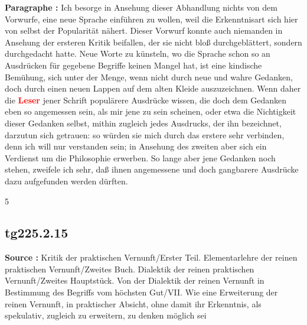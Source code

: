 \documentclass[a4paper,12pt,twoside]{book}
\newcommand{\match}[1]{\textcolor{red}{\textbf{#1}}}
\begin{document}
	\noindent\textbf{Paragraphe : }Ich besorge in Ansehung dieser Abhandlung nichts von dem Vorwurfe, eine neue Sprache einführen zu wollen, weil die Erkenntnisart sich hier von selbst der Popularität nähert. Dieser Vorwurf konnte auch niemanden in Ansehung der ersteren Kritik beifallen, der sie nicht bloß durchgeblättert, sondern durchgedacht hatte. Neue Worte zu künsteln, wo die Sprache schon so an Ausdrücken für gegebene Begriffe keinen Mangel hat, ist eine kindische Bemühung, sich unter der Menge, wenn nicht durch neue und wahre Gedanken, doch durch einen neuen Lappen auf dem alten Kleide auszuzeichnen. Wenn daher die \match{Leser} jener Schrift populärere Ausdrücke wissen, die doch dem Gedanken eben so angemessen sein, als mir jene zu sein scheinen, oder etwa die Nichtigkeit dieser Gedanken selbst, mithin zugleich jedes Ausdrucks, der ihn bezeichnet, darzutun sich getrauen: so würden sie mich durch das erstere sehr verbinden, denn ich will nur verstanden  sein; in Ansehung des zweiten aber sich ein Verdienst um die Philosophie erwerben. So lange aber jene Gedanken noch stehen, zweifele ich sehr, daß ihnen angemessene und doch gangbarere Ausdrücke dazu aufgefunden werden dürften.
	
	
	5
	
	
	
	\subsection*{tg225.2.15} 
	\textbf{Source : }Kritik der praktischen Vernunft/Erster Teil. Elementarlehre der reinen praktischen Vernunft/Zweites Buch. Dialektik der reinen praktischen Vernunft/Zweites Hauptstück. Von der Dialektik der reinen Vernunft in Bestimmung des Begriffs vom höchsten Gut/VII. Wie eine Erweiterung der reinen Vernunft, in praktischer Absicht, ohne damit ihr Erkenntnis, als spekulativ, zugleich zu erweitern, zu denken möglich sei\\  
	
\end{document}
